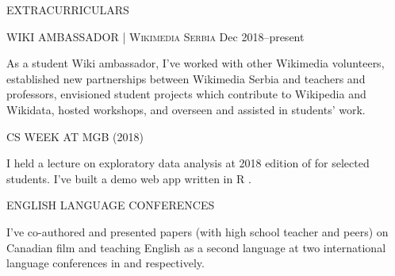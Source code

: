 \begin{minipage}[t]{\linewidth}\vspace{\sectionTopmargin}
{\titleFont\light EXTRACURRICULARS}\newline

\begin{minipage}[t]{\linewidth}\vspace{-4mm}
{\subtitleFont\bold WIKI AMBASSADOR \extraLight\scshape | Wikimedia Serbia}\newline
{\vfill\vspace{\dateTopMargin}\dateFont\extraLight Dec 2018--present\alignRight}\linebreak\newline

\vspace{-7mm}
{\contentFont As a student Wiki ambassador, I’ve worked with other Wikimedia volunteers, established new partnerships between Wikimedia Serbia and teachers and professors, envisioned student projects which contribute to Wikipedia and Wikidata, hosted workshops, and overseen and assisted in students’ work.}
\end{minipage}\newline%

\vspace{\subsectionSpace}
{\subtitleFont\bold CS WEEK AT MGB \dateFont\extraLight(2018)}\newline
\newline

\vspace{-7mm}
{\contentFont I held a lecture on exploratory data analysis at 2018 edition of  for selected students. I've built a demo web app written in R .}
\end{minipage}
\newline%
%
\begin{minipage}[t]{\linewidth}\vspace{\subsectionSpace}
{\subtitleFont\bold ENGLISH LANGUAGE CONFERENCES}\newline
\newline

\vspace{-7mm}
{\contentFont I've co-authored and presented papers (with high school teacher and peers) on Canadian film and teaching English as a second language at two international language conferences in  and  respectively.}
\end{minipage}